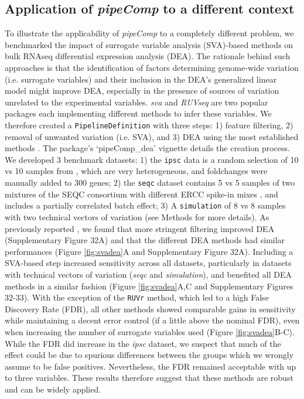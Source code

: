 \documentclass{bmcart}
\begin{document}
{\color{red}\subsection*{Application of \textit{pipeComp} to a different context}

To illustrate the applicability of \textit{pipeComp} to a completely different problem, we benchmarked the impact of surrogate variable analysis (SVA)-based methods on bulk RNAseq differential expression analysis (DEA). The rationale behind such approaches is that the identification of factors determining genome-wide variation (i.e. surrogate variables) and their inclusion in the DEA's generalized linear model might improve DEA, especially in the presence of sources of variation unrelated to the experimental variables. \textit{sva} \citep{leekCapturingHeterogeneityGene2007,leekSvaPackageRemoving2012} and \textit{RUVseq} \citep{rissoNormalizationRNAseq2014a} are two popular packages each implementing different methods to infer these variables. We therefore created a \texttt{PipelineDefinition} with three steps: 1) feature filtering, 2) removal of unwanted variation (i.e. SVA), and 3) DEA using the most established methods  \citep{germainRNAontheBENCHComputationalEmpirical2016}. The package's `pipeComp\_dea' vignette details the creation process. We developed 3 benchmark datasets: 1) the \texttt{ipsc} data is a random selection of 10 vs 10 samples from \citep{carcamoOriveAnalysisTranscriptional2017}, which are very heterogeneous, and foldchanges were manually added to 300 genes; 2) the \texttt{seqc} dataset contains 5 vs 5 samples of two mixtures of the SEQC consortium with different ERCC spike-in mixes \citep{ComprehensiveAssessment2014}, and includes a partially correlated batch effect; 3) A \texttt{simulation} of 8 vs 8 samples with two technical vectors of variation (see Methods for more details). As previously reported \citep{ComprehensiveAssessment2014}, we found that more stringent filtering improved DEA (Supplementary Figure 32A) and that the different DEA methods had similar performances (Figure \ref{fig:svadea}A and Supplementary Figure 32A). Including a SVA-based step increased sensitivity across all datasets, particularly in datasets with technical vectors of variation (\textit{seqc} and \textit{simulation}), and benefited all DEA methods in a similar fashion (Figure \ref{fig:svadea}A,C and Supplementary Figures 32-33). With the exception of the \texttt{RUVr} method, which led to a high False Discovery Rate (FDR), all other methods showed comparable gains in sensitivity while maintaining a decent error control (if a little above the nominal FDR), even when increasing the number of surrogate variables used (Figure \ref{fig:svadea}B-C). While the FDR did increase in the \textit{ipsc} dataset, we suspect that much of the effect could be due to spurious differences \citep{germainTamingHumanGenetic2017} between the groups which we wrongly assume to be false positives. Nevertheless, the FDR remained acceptable with up to three variables. These results therefore suggest that these methods are robust and can be widely applied.}
\end{document}
